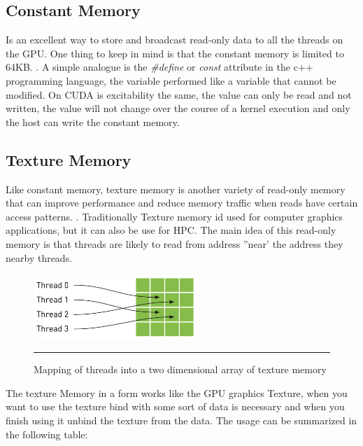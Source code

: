 
\subsection{Constant Memory}

Is an excellent way to store and broadcast read-only data to all the threads on the GPU. One thing to keep in mind is that the constant memory is limited to 64KB. \cite{design}. A simple analogue is the  \textit{\#define} or \textit{const} attribute in the c++ programming language, the variable performed like a variable that cannot be modified. On CUDA is  excitability the same, the value can only be read and not written, the value will not change over the course of a kernel execution and only the host can write the constant memory.\cite{example}

\subsection{Texture Memory}

Like constant memory, texture memory is another variety of read-only memory that can improve performance and reduce memory traffic when reads have certain access patterns. . Traditionally Texture memory id used for computer graphics applications, but it can also be use for HPC. The main idea of this read-only memory is that threads are likely to read from address ''near' the address they nearby threads.\cite{example}


\begin{figure}[htbp]
	\centering
		\includegraphics[width=0.55\textwidth]{Figures/texture.png}
		\rule{35em}{0.5pt}
	\caption[Texture Memory]{Mapping of threads into a two dimensional array of texture memory}
	\label{fig:texture}
\end{figure}

The texture Memory in a form works like the GPU graphics Texture, when you want to use the texture bind with some sort of data is necessary and when you finish using it unbind the texture from the data. The usage can be summarized in the following table:

